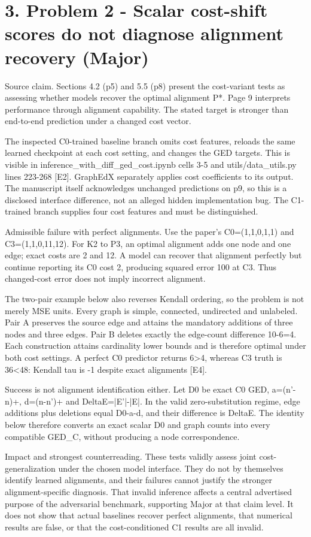 \documentclass[10pt]{article}
\begin{document}
\section*{3. Problem 2 - Scalar cost-shift scores do not diagnose alignment recovery (Major)}
Source claim. Sections 4.2 (p5) and 5.5 (p8) present the cost-variant tests as assessing whether models recover the optimal alignment P*. Page 9 interprets performance through alignment capability. The stated target is stronger than end-to-end prediction under a changed cost vector.\par
The inspected C0-trained baseline branch omits cost features, reloads the same learned checkpoint at each cost setting, and changes the GED targets. This is visible in inference\_with\_diff\_ged\_cost.ipynb cells 3-5 and utils/data\_utils.py lines 223-268 [E2]. GraphEdX separately applies cost coefficients to its output. The manuscript itself acknowledges unchanged predictions on p9, so this is a disclosed interface difference, not an alleged hidden implementation bug. The C1-trained branch supplies four cost features and must be distinguished.\par
Admissible failure with perfect alignments. Use the paper’s C0=(1,1,0,1,1) and C3=(1,1,0,11,12). For K2 to P3, an optimal alignment adds one node and one edge; exact costs are 2 and 12. A model can recover that alignment perfectly but continue reporting its C0 cost 2, producing squared error 100 at C3. Thus changed-cost error does not imply incorrect alignment.\par
The two-pair example below also reverses Kendall ordering, so the problem is not merely MSE units. Every graph is simple, connected, undirected and unlabeled. Pair A preserves the source edge and attains the mandatory additions of three nodes and three edges. Pair B deletes exactly the edge-count difference 10-6=4. Each construction attains cardinality lower bounds and is therefore optimal under both cost settings. A perfect C0 predictor returns 6>4, whereas C3 truth is 36<48: Kendall tau is -1 despite exact alignments [E4].\par
Success is not alignment identification either. Let D0 be exact C0 GED, a=(n’-n)+, d=(n-n’)+ and DeltaE=|E’|-|E|. In the valid zero-substitution regime, edge additions plus deletions equal D0-a-d, and their difference is DeltaE. The identity below therefore converts an exact scalar D0 and graph counts into every compatible GED\_C, without producing a node correspondence.\par
Impact and strongest counterreading. These tests validly assess joint cost-generalization under the chosen model interface. They do not by themselves identify learned alignments, and their failures cannot justify the stronger alignment-specific diagnosis. That invalid inference affects a central advertised purpose of the adversarial benchmark, supporting Major at that claim level. It does not show that actual baselines recover perfect alignments, that numerical results are false, or that the cost-conditioned C1 results are all invalid.\par
\end{document}
